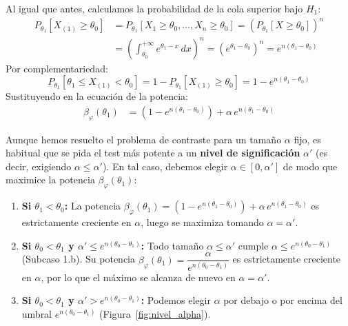 \begin{ejercicio}
\begin{description}
    Al igual que antes, calculamos la probabilidad de la cola superior bajo $H_1$:
    \begin{align*}
        P_{\theta_1}[X_{(1)} \ge \theta_0] &= P_{\theta_1}[X_1 \ge \theta_0, \dots, X_n \ge \theta_0] = \left(P_{\theta_1}[X \ge \theta_0]\right)^n \\
        &= \left( \int_{\theta_0}^{+\infty} e^{\theta_1 - x} \, dx \right)^n = \left( e^{\theta_1 - \theta_0} \right)^n = e^{n(\theta_1 - \theta_0)}
    \end{align*}
    Por complementariedad:
    \begin{equation*}
        P_{\theta_1}[\theta_1 \le X_{(1)} < \theta_0] = 1 - P_{\theta_1}[X_{(1)} \ge \theta_0] = 1 - e^{n(\theta_1 - \theta_0)}
    \end{equation*}
    Sustituyendo en la ecuación de la potencia:
    \begin{align*}
        \beta_\varphi(\theta_1) & = \left(1 - e^{n(\theta_1 - \theta_0)}\right) + \alpha \, e^{n(\theta_1 - \theta_0)}
    \end{align*}
\end{description}
    
    Aunque hemos resuelto el problema de contraste para un tamaño $\alpha$ fijo, es habitual que se pida el test más potente a un \textbf{nivel de significación} $\alpha'$ (es decir, exigiendo $\alpha \le \alpha'$). En tal caso, debemos elegir $\alpha \in [0, \alpha']$ de modo que maximice la potencia $\beta_\varphi(\theta_1)$:
    \begin{enumerate}
        \item \textbf{Si $\theta_1 < \theta_0$:} La potencia $\beta_\varphi(\theta_1) = (1 - e^{n(\theta_1 - \theta_0)}) + \alpha \, e^{n(\theta_1 - \theta_0)}$ es estrictamente creciente en $\alpha$, luego se maximiza tomando $\alpha = \alpha'$.
        
        \item \textbf{Si $\theta_0 < \theta_1$ y $\alpha' \le e^{n(\theta_0 - \theta_1)}$:} Todo tamaño $\alpha \le \alpha'$ cumple $\alpha \le e^{n(\theta_0 - \theta_1)}$ (Subcaso 1.b). Su potencia $\beta_\varphi(\theta_1) = \dfrac{\alpha}{e^{n(\theta_0 - \theta_1)}}$ es estrictamente creciente en $\alpha$, por lo que el máximo se alcanza de nuevo en $\alpha = \alpha'$.
        
        \item \textbf{Si $\theta_0 < \theta_1$ y $\alpha' > e^{n(\theta_0 - \theta_1)}$:} Podemos elegir $\alpha$ por debajo o por encima del umbral $e^{n(\theta_0 - \theta_1)}$ (Figura~\ref{fig:nivel_alpha}).
        \begin{figure}[ht]
            \centering
\end{figure}
\end{enumerate}
\end{ejercicio}

